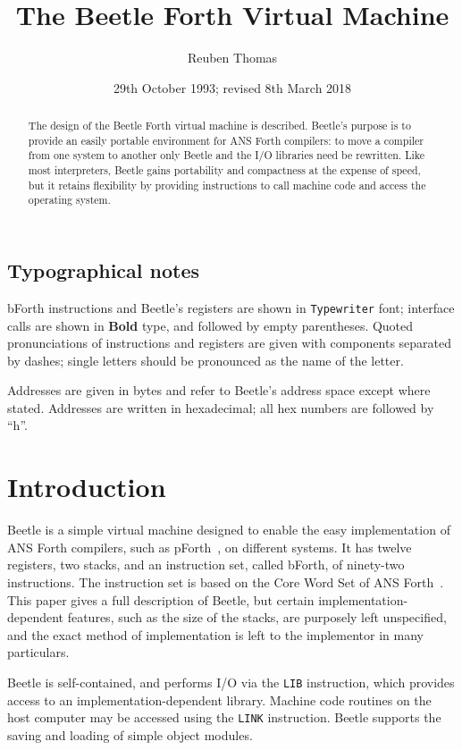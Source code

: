 \documentclass[english]{article}
\title{The Beetle Forth Virtual Machine}
\author{Reuben Thomas}
\date{29th October 1993; revised 8th March 2018}
\newlength{\pronunc}\pronunc=1.7in
\begin{document}
\maketitle

\begin{abstract}
\noindent The design of the Beetle Forth virtual machine is described.
Beetle's purpose is to provide an easily portable environment for ANS Forth
compilers: to move a compiler from one system to another only Beetle and the I/O
libraries need be rewritten. Like most interpreters, Beetle gains portability
and compactness at the expense of speed, but it retains flexibility by providing
instructions to call machine code and access the operating system.
\end{abstract}


\subsection*{Typographical notes}

bForth instructions and Beetle's registers are shown in {\tt Typewriter} font;
interface calls are shown in {\bf Bold} type, and followed by empty parentheses.
Quoted pronunciations of instructions and registers are given with components
separated by dashes; single letters should be pronounced as the name of the
letter.

Addresses are given in bytes and refer to Beetle's address space except where
stated. Addresses are written in hexadecimal; all hex numbers are followed by
``h''.


\section{Introduction}

Beetle is a simple virtual machine designed to enable the easy implementation
of ANS Forth compilers, such as pForth~\cite{beetledis}, on different systems.
It has twelve registers, two stacks, and an instruction set, called bForth, of
ninety-two instructions. The instruction set is based on the Core Word Set of
ANS Forth~\cite{ANSIforth}. This paper gives a full description of Beetle, but
certain implementation-dependent features, such as the size of the stacks, are
purposely left unspecified, and the exact method of implementation is left to
the implementor in many particulars.

Beetle is self-contained, and performs I/O via the {\tt LIB} instruction, which
provides access to an implementation-dependent library. Machine
code routines on the host computer may be accessed using the {\tt LINK}
instruction. Beetle supports the saving and loading of simple object modules.
\end{document}

